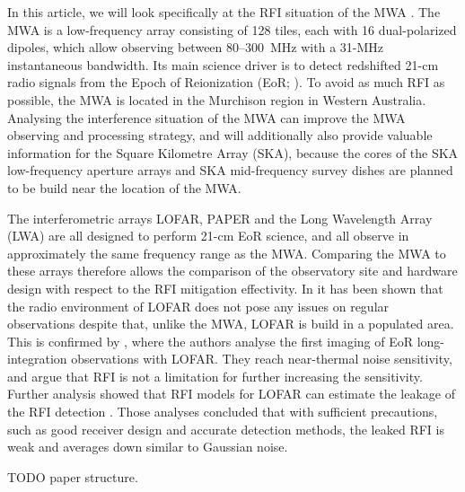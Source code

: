 \documentclass[useAMS,usenatbib]{mn2e}
\begin{document}
In this article, we will look specifically at the RFI situation of the MWA \citep{mwa}. The MWA is a low-frequency array consisting of 128 tiles, each with 16 dual-polarized dipoles, which allow observing between 80--300~MHz with a 31-MHz instantaneous bandwidth. Its main science driver is to detect redshifted 21-cm radio signals from the Epoch of Reionization (EoR; \citealt{bowman-science-with-the-mwa-2013}). To avoid as much RFI as possible, the MWA is located in the Murchison region in Western Australia. Analysing the interference situation of the MWA can improve the MWA observing and processing strategy, and will additionally also provide valuable information for the Square Kilometre Array (SKA), because the cores of the SKA low-frequency aperture arrays and SKA mid-frequency survey dishes are planned to be build near the location of the MWA.

The interferometric arrays LOFAR, PAPER and the Long Wavelength Array (LWA) are all designed to perform 21-cm EoR science, and all observe in approximately the same frequency range as the MWA. Comparing the MWA to these arrays therefore allows the comparison of the observatory site and hardware design with respect to the RFI mitigation effectivity. In \citet{lofar-radio-environment} it has been shown that the radio environment of LOFAR does not pose any issues on regular observations despite that, unlike the MWA, LOFAR is build in a populated area. This is confirmed by \citet{ncp-eor-yatawatta}, where the authors analyse the first imaging of EoR long-integration observations with LOFAR. They reach near-thermal noise sensitivity, and argue that RFI is not a limitation for further increasing the sensitivity. Further analysis showed that RFI models for LOFAR can estimate the leakage of the RFI detection \citep{offringa-rfi-distributions}. Those analyses concluded that with sufficient precautions, such as good receiver design and accurate detection methods, the leaked RFI is weak and averages down similar to Gaussian noise.

TODO paper structure.
\end{document}

